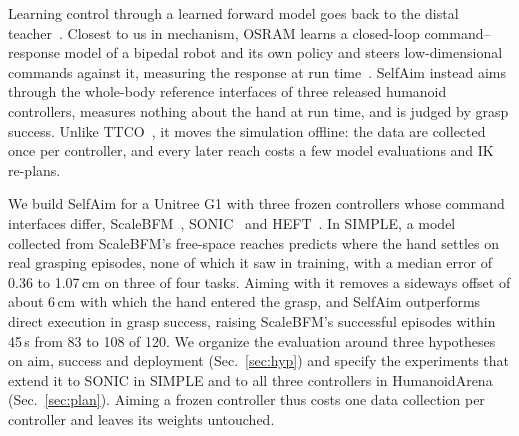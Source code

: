 \documentclass[conference]{IEEEtran}
\begin{document}
Learning control through a learned forward model goes back to the distal teacher~\cite{jordan1992}. Closest to us in mechanism, OSRAM learns a closed-loop command--response model of a bipedal robot and its own policy and steers low-dimensional commands against it, measuring the response at run time~\cite{osram}. SelfAim instead aims through the whole-body reference interfaces of three released humanoid controllers, measures nothing about the hand at run time, and is judged by grasp success. Unlike TTCO~\cite{ttco}, it moves the simulation offline: the data are collected once per controller, and every later reach costs a few model evaluations and IK re-plans.

We build SelfAim for a Unitree G1 with three frozen controllers whose command interfaces differ, ScaleBFM~\cite{scalebfm}, SONIC~\cite{sonic} and HEFT~\cite{heft}. In SIMPLE, a model collected from ScaleBFM's free-space reaches predicts where the hand settles on real grasping episodes, none of which it saw in training, with a median error of 0.36 to 1.07\,cm on three of four tasks. Aiming with it removes a sideways offset of about 6\,cm with which the hand entered the grasp, and SelfAim outperforms direct execution in grasp success, raising ScaleBFM's successful episodes within 45\,s from 83 to 108 of 120. We organize the evaluation around three hypotheses on aim, success and deployment (Sec.~\ref{sec:hyp}) and specify the experiments that extend it to SONIC in SIMPLE and to all three controllers in HumanoidArena~\cite{humanoidarena} (Sec.~\ref{sec:plan}). Aiming a frozen controller thus costs one data collection per controller and leaves its weights untouched.
\end{document}
